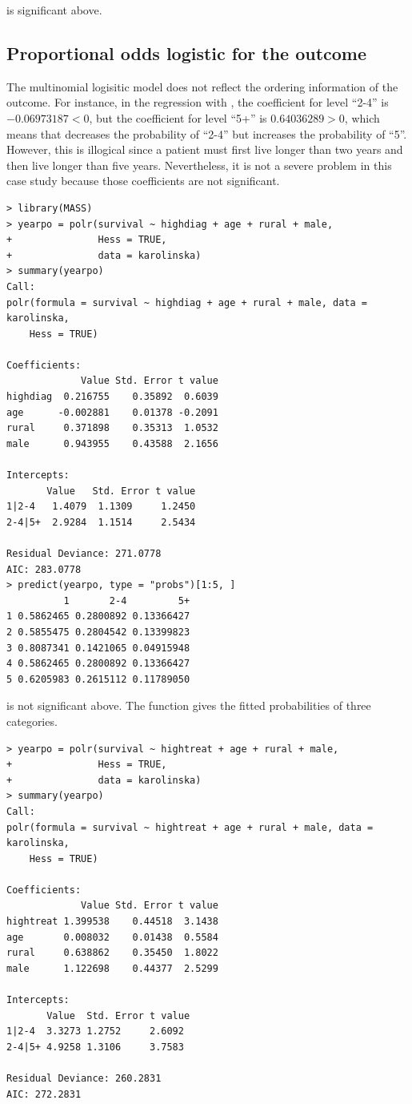  is significant above. 





\subsection{Proportional odds logistic for the outcome}

 


The multinomial logisitic model does not reflect the ordering information of the outcome. For instance, in the regression with , the coefficient for level ``2-4'' is  $-0.06973187<0$, but the coefficient for level ``5+'' is $0.64036289 >0$, which means that  decreases the probability of ``2-4'' but increases the probability of ``5''. However, this is illogical since a patient must first live longer than two years and then live longer than five years. Nevertheless, it is not a severe problem in this case study because those coefficients are not significant. 


\begin{lstlisting}
> library(MASS)
> yearpo = polr(survival ~ highdiag + age + rural + male, 
+               Hess = TRUE, 
+               data = karolinska)
> summary(yearpo)
Call:
polr(formula = survival ~ highdiag + age + rural + male, data = karolinska, 
    Hess = TRUE)

Coefficients:
             Value Std. Error t value
highdiag  0.216755    0.35892  0.6039
age      -0.002881    0.01378 -0.2091
rural     0.371898    0.35313  1.0532
male      0.943955    0.43588  2.1656

Intercepts:
       Value   Std. Error t value
1|2-4   1.4079  1.1309     1.2450
2-4|5+  2.9284  1.1514     2.5434

Residual Deviance: 271.0778 
AIC: 283.0778 
> predict(yearpo, type = "probs")[1:5, ]
          1       2-4         5+
1 0.5862465 0.2800892 0.13366427
2 0.5855475 0.2804542 0.13399823
3 0.8087341 0.1421065 0.04915948
4 0.5862465 0.2800892 0.13366427
5 0.6205983 0.2615112 0.11789050
\end{lstlisting}

 is not significant above. The  function gives the fitted probabilities of three categories. 


\begin{lstlisting}
> yearpo = polr(survival ~ hightreat + age + rural + male, 
+               Hess = TRUE, 
+               data = karolinska)
> summary(yearpo)
Call:
polr(formula = survival ~ hightreat + age + rural + male, data = karolinska, 
    Hess = TRUE)

Coefficients:
             Value Std. Error t value
hightreat 1.399538    0.44518  3.1438
age       0.008032    0.01438  0.5584
rural     0.638862    0.35450  1.8022
male      1.122698    0.44377  2.5299

Intercepts:
       Value  Std. Error t value
1|2-4  3.3273 1.2752     2.6092 
2-4|5+ 4.9258 1.3106     3.7583 

Residual Deviance: 260.2831 
AIC: 272.2831 
\end{lstlisting}

